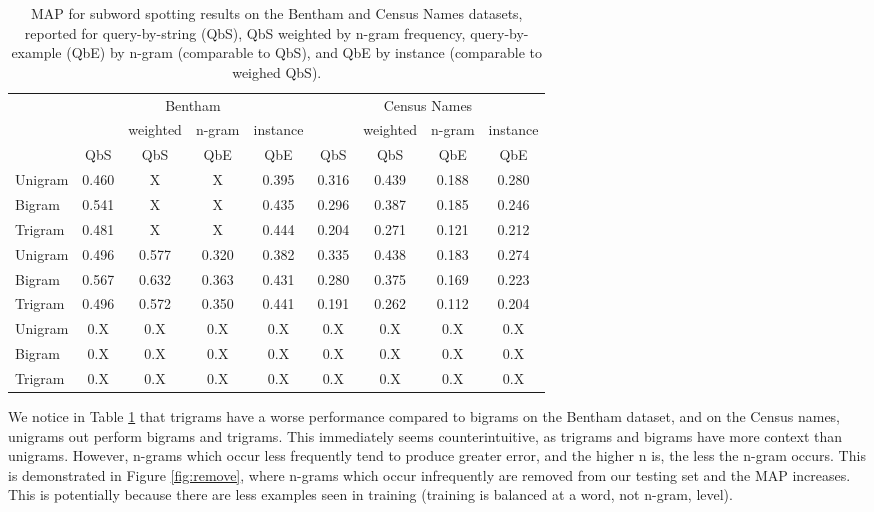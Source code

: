 \documentclass[ms,electronic,twosidetoc,letterpaper,chaptercenter,parttop,lol,lof,lot]{byumsphd}
\begin{document}
\begin{table}
\centering
\begin{tabular}{| l | c c c c | c c c c |}
  \hline
   & \multicolumn{4}{c|}{Bentham} & \multicolumn{4}{c|}{Census Names}\\
   &     & weighted & n-gram & instance &     & weighted & n-gram & instance \\
   & QbS & QbS      & QbE    & QbE      & QbS & QbS      & QbE    & QbE \\
  \hline %
  Unigram & 0.460 & X & X & 0.395  & 0.316 & 0.439 & 0.188 & 0.280\\ %
  Bigram  & 0.541 & X & X & 0.435  & 0.296 & 0.387 & 0.185 & 0.246\\ 
  Trigram & 0.481 & X & X & 0.444  & 0.204 & 0.271 & 0.121 & 0.212\\ 
  \hline %
  Unigram & 0.496 & 0.577 & 0.320 & 0.382  & 0.335 & 0.438 & 0.183 & 0.274\\
  Bigram  & 0.567 & 0.632 & 0.363 & 0.431  & 0.280 & 0.375 & 0.169 & 0.223\\ 
  Trigram & 0.496 & 0.572 & 0.350 & 0.441  & 0.191 & 0.262 & 0.112 & 0.204\\ 
  \hline %
  Unigram &  0.X & 0.X & 0.X & 0.X  & 0.X & 0.X & 0.X & 0.X \\
  Bigram  &  0.X & 0.X & 0.X & 0.X  & 0.X & 0.X & 0.X & 0.X \\
  Trigram &  0.X & 0.X & 0.X & 0.X  & 0.X & 0.X & 0.X & 0.X \\
  \hline 
\end{tabular}
\caption{MAP for subword spotting results on the Bentham and Census Names datasets, reported for query-by-string (QbS), QbS weighted by n-gram frequency, query-by-example (QbE) by n-gram (comparable to QbS), and QbE by instance (comparable to weighed QbS).}
\label{tab:subwordspotting}
\end{table}

We notice in Table \ref{tab:subwordspotting} that trigrams have a worse performance compared to bigrams on the Bentham dataset, and on the Census names, unigrams out perform bigrams and trigrams. This immediately seems counterintuitive, as trigrams and bigrams have more context than unigrams. However, n-grams which occur less frequently tend to produce greater error, and the higher n is, the less the n-gram occurs. 
This is demonstrated in Figure \ref{fig:remove}, where n-grams which occur infrequently are removed from our testing set and the MAP increases. This is potentially because there are less examples seen in training (training is balanced at a word, not n-gram, level).
\end{document}
